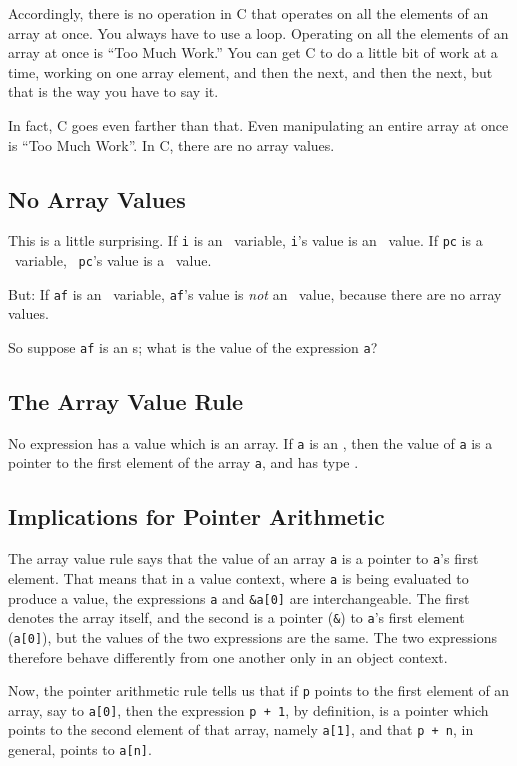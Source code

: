 Accordingly, there is no operation in C that operates on all the
elements of an array at once.  You always have to use a loop.  Operating
on all the elements of an array at once is ``Too Much Work.''  You can
get C to do a little bit of work at a time, working on one array
element, and then the next, and then the next, but that is the way you
have to say it.

In fact, C goes even farther than that.  Even manipulating an entire
array at once is ``Too Much Work''.   In C, there are no array values.  

\subsection{No Array Values}

This is a little surprising.  If {\tt i} is an \int\ variable, {\tt i}'s
value is an \int\ value.  If {\tt pc} is a \Char\ variable, {\tt
pc}'s value is a \Char\ value.  

But: If {\tt af} is an \ao\Float\ variable, {\tt af}'s value is {\em
not}\/ an \ao\Float\ value, because there are no array values.

So suppose {\tt af} is an \ao\Float s; what is the value of the
expression {\tt a}?

\subsection{The Array Value Rule}

No expression has a value which is an array.  If {\tt a} is an
, then the value of {\tt a} is a pointer to the first element
of the array {\tt a}, and has type .

\subsection{Implications for Pointer Arithmetic}
\label{array-in-value-context}
The array value rule says that the value of an array {\tt a} is a
pointer to {\tt a}'s first element.  That means that in a value context,
where {\tt a} is being evaluated to produce a value, the expressions
{\tt a} and {\tt\&a[0]} are interchangeable.  The first denotes the
array itself, and the second is a pointer ({\tt \&}) to {\tt a}'s first
element ({\tt a[0]}), but the values of the two expressions are the
same.  The two expressions therefore behave differently from one another
only in an object context.  

Now, the pointer arithmetic rule tells us that if {\tt p} points to the
first element of an array, say to {\tt a[0]}, then the expression {\tt p
+ 1}, by definition, is a pointer which points to the second element of
that array, namely {\tt a[1]}, and that {\tt p + n}, in general, points
to {\tt a[n]}.


